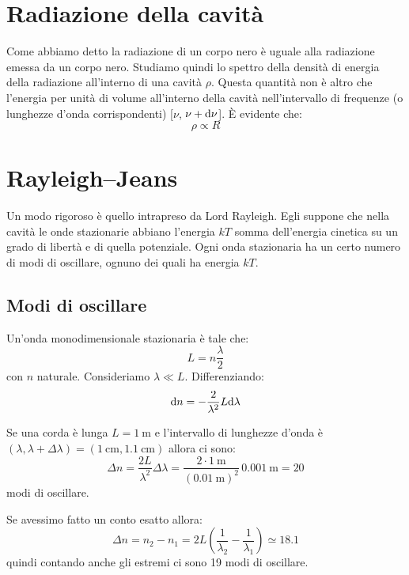 \section{Radiazione della cavità}
Come abbiamo detto la radiazione di un corpo nero è uguale alla radiazione emessa da un corpo nero. Studiamo quindi lo spettro della densità di energia della radiazione all'interno di una cavità $\rho$. Questa quantità non è altro che l'energia per unità di volume all'interno della cavità nell'intervallo di frequenze (o lunghezze d'onda corrispondenti) [$\nu$, $\nu+\mathrm{d}\nu$]. È evidente che:
\begin{equation}
	\rho \propto R
\end{equation}

\section{Rayleigh--Jeans}
Un modo rigoroso è quello intrapreso da Lord Rayleigh. Egli suppone che nella cavità le onde stazionarie abbiano l'energia $kT$ somma dell'energia cinetica su un grado di libertà e di quella potenziale. Ogni onda stazionaria ha un certo numero di modi di oscillare, ognuno dei quali ha energia $kT$.
\subsection{Modi di oscillare}
Un'onda monodimensionale stazionaria è tale che:
\begin{equation}
	L=n\frac{\lambda}{2}
\end{equation}
con $n$ naturale. Consideriamo $\lambda\ll L$. Differenziando:
\begin{equation}
	\mathrm{d} n=-\frac{2}{\lambda^2}L\mathrm{d} \lambda
\end{equation}
\begin{Es}
	Se una corda è lunga $L=\SI{1}{\meter}$ e l'intervallo di lunghezze d'onda è $(\lambda,\lambda+\Delta\lambda)=(\SI{1}{\centi\meter},\SI{1.1}{\centi\meter})$ allora ci sono:
	\[
		\Delta n=\frac{2L}{\lambda^2}\Delta\lambda=\frac{2\cdot\SI{1}{\meter}}{(\SI{0.01}{\meter})^2}\,\SI{0.001}{\meter}=20
	\]
	modi di oscillare.

	Se avessimo fatto un conto esatto allora:
	\[
		\Delta n=n_2-n_1=2L\left(\frac{1}{\lambda_2}-\frac{1}{\lambda_1}\right)\simeq 18.1
	\]
	quindi contando anche gli estremi ci sono 19 modi di oscillare.
\end{Es}

